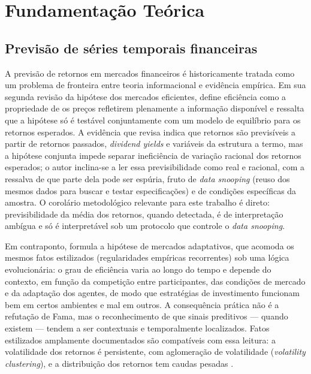 \chapter{Fundamentação Teórica} \label{chap:fundamentacao}


\section{Previsão de séries temporais financeiras}
A previsão de retornos em mercados financeiros é historicamente tratada como um problema de fronteira entre teoria informacional e evidência empírica. Em sua segunda revisão da hipótese dos mercados eficientes,  define eficiência como a propriedade de os preços refletirem plenamente a informação disponível e ressalta que a hipótese só é testável conjuntamente com um modelo de equilíbrio para os retornos esperados. A evidência que revisa indica que retornos são previsíveis a partir de retornos passados, \textit{dividend yields} e variáveis da estrutura a termo, mas a hipótese conjunta impede separar ineficiência de variação racional dos retornos esperados; o autor inclina-se a ler essa previsibilidade como real e racional, com a ressalva de que parte dela pode ser espúria, fruto de \textit{data snooping} (reuso dos mesmos dados para buscar e testar especificações) e de condições específicas da amostra. O corolário metodológico relevante para este trabalho é direto: previsibilidade da média dos retornos, quando detectada, é de interpretação ambígua e só é interpretável sob um protocolo que controle o \textit{data snooping}.

Em contraponto,  formula a hipótese de mercados adaptativos, que acomoda os mesmos fatos estilizados (regularidades empíricas recorrentes) sob uma lógica evolucionária: o grau de eficiência varia ao longo do tempo e depende do contexto, em função da competição entre participantes, das condições de mercado e da adaptação dos agentes, de modo que estratégias de investimento funcionam bem em certos ambientes e mal em outros. A consequência prática não é a refutação de Fama, mas o reconhecimento de que sinais preditivos --- quando existem --- tendem a ser contextuais e temporalmente localizados. Fatos estilizados amplamente documentados são compatíveis com essa leitura: a volatilidade dos retornos é persistente, com aglomeração de volatilidade (\textit{volatility clustering}), e a distribuição dos retornos tem caudas pesadas \cite{CONT2001}.

